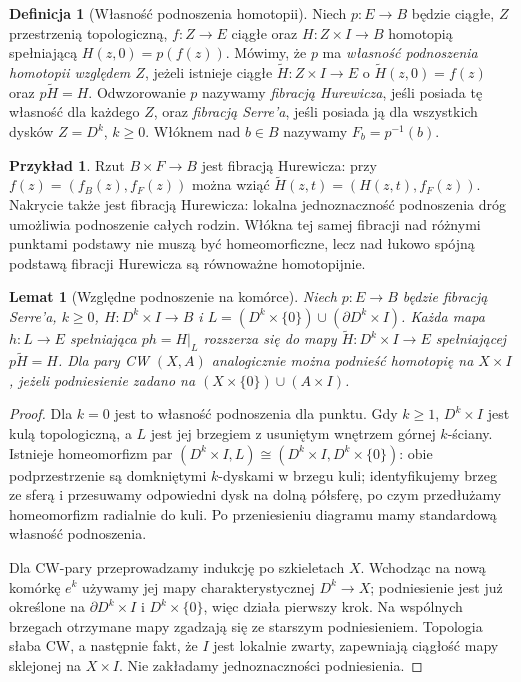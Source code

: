 \documentclass[11pt,a4paper,oneside]{report}
\theoremstyle{plain}
\newtheorem{lemat}[twierdzenie]{Lemat}
\theoremstyle{definition}
\newtheorem{definicja}[twierdzenie]{Definicja}
\newtheorem{przyklad}[twierdzenie]{Przykład}
\theoremstyle{remark}
\begin{document}
\begin{definicja}[Własność podnoszenia homotopii]
Niech $p:E\to B$ będzie ciągłe, $Z$ przestrzenią topologiczną,
$f:Z\to E$ ciągłe oraz $H:Z\times I\to B$ homotopią spełniającą
$H(z,0)=p(f(z))$. Mówimy, że $p$ ma \emph{własność podnoszenia
homotopii względem $Z$}, jeżeli istnieje ciągłe
$\widetilde H:Z\times I\to E$ o
$\widetilde H(z,0)=f(z)$ oraz $p\widetilde H=H$.
Odwzorowanie $p$ nazywamy \emph{fibracją Hurewicza}, jeśli posiada tę
własność dla każdego $Z$, oraz \emph{fibracją Serre'a}, jeśli posiada ją
dla wszystkich dysków $Z=D^k$, $k\ge0$. Włóknem nad $b\in B$ nazywamy
$F_b=p^{-1}(b)$.
\end{definicja}

\begin{przyklad}
Rzut $B\times F\to B$ jest fibracją Hurewicza: przy
$f(z)=(f_B(z),f_F(z))$ można wziąć
$\widetilde H(z,t)=(H(z,t),f_F(z))$. Nakrycie także jest fibracją
Hurewicza: lokalna jednoznaczność podnoszenia dróg umożliwia
podnoszenie całych rodzin. Włókna tej samej fibracji nad różnymi punktami podstawy nie
muszą być homeomorficzne, lecz nad łukowo spójną podstawą
fibracji Hurewicza są równoważne homotopijnie.
\end{przyklad}

\begin{lemat}[Względne podnoszenie na komórce]
\label{lem:fib-wzgledne-v4}
Niech $p:E\to B$ będzie fibracją Serre'a, $k\ge0$,
$H:D^k\times I\to B$ i
$L=(D^k\times\{0\})\cup(\partial D^k\times I)$.
Każda mapa $h:L\to E$ spełniająca $ph=H|_L$ rozszerza się do mapy
$\widetilde H:D^k\times I\to E$ spełniającej
$p\widetilde H=H$. Dla pary CW $(X,A)$ analogicznie można podnieść
homotopię na $X\times I$, jeżeli podniesienie zadano na
$(X\times\{0\})\cup(A\times I)$.
\end{lemat}
\begin{proof}
Dla $k=0$ jest to własność podnoszenia dla punktu. Gdy $k\ge1$,
$D^k\times I$ jest kulą topologiczną, a $L$ jest jej brzegiem
z usuniętym wnętrzem górnej $k$-ściany. Istnieje homeomorfizm par
$(D^k\times I,L)\cong(D^k\times I,D^k\times\{0\})$:
obie podprzestrzenie są domkniętymi $k$-dyskami w brzegu kuli;
identyfikujemy brzeg ze sferą i przesuwamy odpowiedni dysk na dolną
półsferę, po czym przedłużamy homeomorfizm radialnie do kuli.
Po przeniesieniu diagramu mamy standardową własność podnoszenia.

Dla CW-pary przeprowadzamy indukcję po szkieletach $X$.
Wchodząc na nową komórkę $e^k$ używamy jej mapy
charakterystycznej $D^k\to X$; podniesienie jest już określone
na $\partial D^k\times I$ i $D^k\times\{0\}$, więc działa pierwszy
krok. Na wspólnych brzegach otrzymane mapy zgadzają się ze
starszym podniesieniem. Topologia słaba CW, a następnie fakt,
że $I$ jest lokalnie zwarty, zapewniają ciągłość mapy sklejonej
na $X\times I$. Nie zakładamy jednoznaczności podniesienia.
\end{proof}
\end{document}
